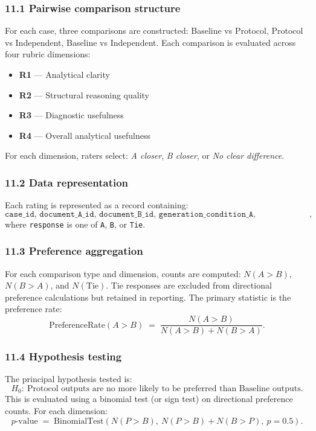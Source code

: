 {\subsubsection*{11.1 Pairwise comparison structure}
For each case, three comparisons are constructed: Baseline vs Protocol, Protocol vs Independent, Baseline vs Independent.
Each comparison is evaluated across four rubric dimensions:
\begin{itemize}
  \item \textbf{R1} --- Analytical clarity
  \item \textbf{R2} --- Structural reasoning quality
  \item \textbf{R3} --- Diagnostic usefulness
  \item \textbf{R4} --- Overall analytical usefulness
\end{itemize}
For each dimension, raters select: \emph{A closer}, \emph{B closer}, or \emph{No clear difference}.

\subsubsection*{11.2 Data representation}
Each rating is represented as a record containing:
\[
\texttt{case\_id, document\_A\_id, document\_B\_id, generation\_condition\_A, generation\_condition\_B, rater\_id, dimension, response},
\]
where \texttt{response} is one of \texttt{A}, \texttt{B}, or \texttt{Tie}.

\subsubsection*{11.3 Preference aggregation}
For each comparison type and dimension, counts are computed:
$N(A>B)$, $N(B>A)$, and $N(\mathrm{Tie})$.
Tie responses are excluded from directional preference calculations but retained in reporting.
The primary statistic is the preference rate:
\[
\mathrm{PreferenceRate}(A>B) \;=\; \frac{N(A>B)}{N(A>B) + N(B>A)}.
\]

\subsubsection*{11.4 Hypothesis testing}
The principal hypothesis tested is:
\[
H_0:\ \text{Protocol outputs are no more likely to be preferred than Baseline outputs.}
\]
This is evaluated using a binomial test (or sign test) on directional preference counts. For each dimension:
\[
p\text{-value} \;=\; \mathrm{BinomialTest}\!\left(N(P>B),\ N(P>B)+N(B>P),\ p=0.5\right).
\]

}

